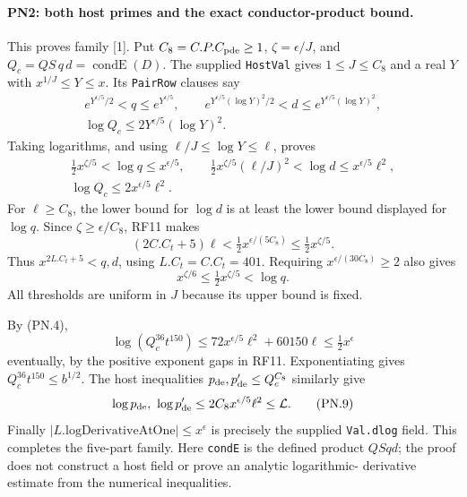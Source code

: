 \documentclass[11pt,a4paper]{article}
\numberwithin{equation}{section}
\theoremstyle{remark}\newtheorem{remark}[theorem]{Remark}
\begin{document}
\paragraph{PN2: both host primes and the exact conductor-product bound.}
This proves family [1]. Put $C_8=C.P.C_{\rm pde}\geq1$,
$\zeta=\epsilon/J$, and $Q_c=QS\,q\,d=\operatorname{condE}(D)$.
The supplied \texttt{HostVal} gives $1\leq J\leq C_8$ and a real $Y$
with $x^{1/J}\leq Y\leq x$. Its \texttt{PairRow} clauses say
\begin{gather*}
 e^{Y^{\epsilon/5}/2}<q\leq e^{Y^{\epsilon/5}},\qquad
 e^{Y^{\epsilon/5}(\log Y)^2/2}<d
                 \leq e^{Y^{\epsilon/5}(\log Y)^2},\\
 \log Q_c\leq2Y^{\epsilon/5}(\log Y)^2.
\end{gather*}
Taking logarithms, and using $\ell/J\leq\log Y\leq\ell$, proves
\begin{gather*}
 \tfrac12x^{\zeta/5}<\log q\leq x^{\epsilon/5},\qquad
 \tfrac12x^{\zeta/5}(\ell/J)^2<\log d
                                  \leq x^{\epsilon/5}\ell^2,\\
 \log Q_c\leq2x^{\epsilon/5}\ell^2.                         \tag{PN.6}
\end{gather*}
For $\ell\geq C_8$, the lower bound for $\log d$ is at least the
lower bound displayed for $\log q$. Since
$\zeta\geq\epsilon/C_8$, RF11 makes
\[
 (2C.C_t+5)\ell<\tfrac12x^{\epsilon/(5C_8)}
                                      \leq\tfrac12x^{\zeta/5}.
\]
Thus $x^{2L.C_t+5}<q,d$, using $L.C_t=C.C_t=401$.
Requiring $x^{\epsilon/(30C_8)}\geq2$ also gives
\[
 x^{\zeta/6}\leq\tfrac12x^{\zeta/5}<\log q.            \tag{PN.7}
\]
All thresholds are uniform in $J$ because its upper bound is fixed.

By (PN.4),
\[
 \log(Q_c^{36}t^{150})
 \leq72x^{\epsilon/5}\ell^2+60150\ell
 \leq\tfrac12x^\epsilon                                  \tag{PN.8}
\]
eventually, by the positive exponent gaps in RF11. Exponentiating
gives $Q_c^{36}t^{150}\leq b^{1/2}$. The host inequalities
$p_{\rm de},p'_{\rm de}\leq Q_c^{C_8}$ similarly give
\[
 \log p_{\rm de},\ \log p'_{\rm de}
       \leq2C_8x^{\epsilon/5}\ell^2\leq\mathcal L.       \tag{PN.9}
\]
Finally $|L.\mathrm{logDerivativeAtOne}|\leq x^\epsilon$ is precisely
the supplied \texttt{Val.dlog} field. This completes the five-part
family. Here \texttt{condE} is the defined product $QSqd$; the proof
does not construct a host field or prove an analytic logarithmic-
derivative estimate from the numerical inequalities.
\end{document}
